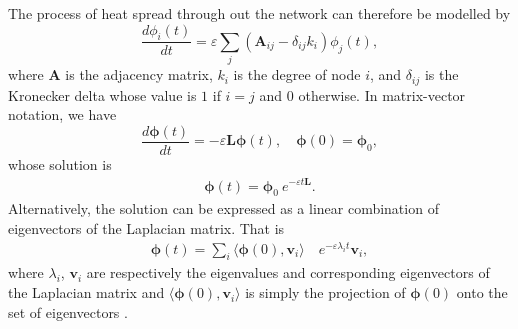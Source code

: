 \documentclass[10pt,a4paper]{article}
\begin{document}
    	The process of heat spread through out the network can therefore be modelled by
    	\begin{equation}
    	\frac{d\phi_i(t)}{dt} = \varepsilon \sum_j (\mathbf{A}_{ij} - \delta_{ij} k_i) \phi_j(t),
    	\label{difusion}
    	\end{equation}
    	where $\mathbf{A}$ is the adjacency matrix, $k_i$ is the degree of node $i$, and $\delta_{ij}$ is the Kronecker delta whose value is $1$ if $i=j$ and $0$ otherwise. In matrix-vector notation, we have
    	\begin{equation}
    	\frac{d\boldsymbol{\phi}(t)}{dt} = -\varepsilon\mathbf{L}\boldsymbol{\phi}(t), \quad \boldsymbol{\phi}(0) = \boldsymbol{\phi}_0 ,
    	\label{dif-final-eqn}
    	\end{equation}
    	whose solution is 
    	\begin{eqnarray}
    	\boldsymbol{\phi}(t) = \boldsymbol{\phi}_0~e^{-\varepsilon t \mathbf{L}}.
    	\end{eqnarray}
    	Alternatively, the solution can be expressed as a linear combination of eigenvectors of the Laplacian matrix. That is
    	 \begin{eqnarray*}
    	 	\boldsymbol{\phi}(t) = \sum_i \langle \boldsymbol{\phi}(0),\mathbf{v}_i \rangle \quad e^{-\varepsilon\lambda_i t} \mathbf{v}_i,  
    	 \end{eqnarray*}
    	 where $\lambda_i$, $\mathbf{v}_i$ are respectively the eigenvalues and corresponding eigenvectors of the Laplacian matrix and $\langle \boldsymbol{\phi}(0),\mathbf{v}_i \rangle$ is simply the projection of $\boldsymbol{\phi}(0)$ onto the set of eigenvectors \citep{anton2007elementary}.
    	 
\end{document}
